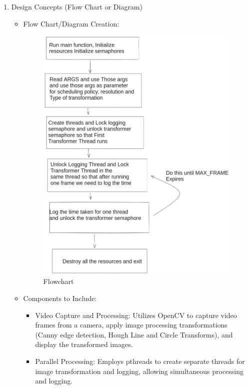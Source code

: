 \documentclass[a4paper,11pt]{article}%
\newenvironment{qanda}{\setlength{\parindent}{0pt}}{\bigskip}
\begin{document}
\begin{qanda}
\begin{enumerate}
			\begin{enumerate}
				\item Design Concepts (Flow Chart or Diagram)
				      \begin{itemize}
					      \item Flow Chart/Diagram Creation:
					            \begin{figure}[H]
						            \centering
						            \includegraphics[scale=0.40]{figures/flowchard.png}
						            \caption{Flowchart}
					            \end{figure}
					      \item Components to Include:
					            \begin{itemize}
						            \item Video Capture and Processing: Utilizes OpenCV to capture video frames from a camera, apply image processing transformations (Canny edge detection, Hough Line and Circle Transforms), and display the transformed images.
						            \item Parallel Processing: Employs pthreads to create separate threads for image transformation and logging, allowing simultaneous processing and logging.

\end{itemize}
\end{itemize}
\end{enumerate}
\end{enumerate}
\end{qanda}
\end{document}
